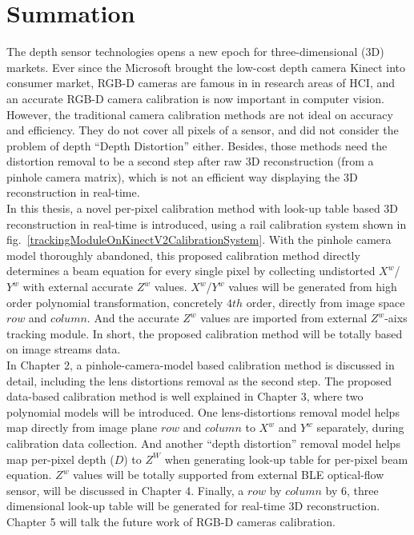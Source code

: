 \section{Summation}
\indent
The depth sensor technologies opens a new epoch for three-dimensional (3D) markets. Ever since the Microsoft brought the low-cost depth camera Kinect into consumer market, RGB-D cameras are famous in in research areas of HCI, and an accurate RGB-D camera calibration is now important in computer vision. However, the traditional camera calibration methods are not ideal on accuracy and efficiency. They do not cover all pixels of a sensor, and did not consider the problem of depth \enquote{Depth Distortion} either. Besides, those methods need the distortion removal to be a second step after raw 3D reconstruction (from a pinhole camera matrix), which is not an efficient way displaying the 3D reconstruction in real-time.
\\\indent
In this thesis, a novel per-pixel calibration method with look-up table based 3D reconstruction in real-time is introduced, using a rail calibration system shown in fig.~\ref{trackingModuleOnKinectV2CalibrationSystem}. With the pinhole camera model thoroughly abandoned, this proposed calibration method directly determines a beam equation for every single pixel by collecting undistorted \(X^{w}\)/\(Y^{w}\) with external accurate \(Z^{w}\) values. \(X^{w}\)/\(Y^{w}\) values will be generated from high order polynomial transformation, concretely \(4th\) order, directly from image space \(row\) and \(column\). And the accurate \(Z^{w}\) values are imported from external \(Z^{w}\)-aixs tracking module. In short, the proposed calibration method will be totally based on image streams data.%
\\\indent
In Chapter 2, a pinhole-camera-model based calibration method is discussed in detail, including the lens distortions removal as the second step. The proposed data-based calibration method is well explained in Chapter 3, where two polynomial models will be introduced. One lens-distortions removal model helps map directly from image plane \(row\) and \(column\) to \(X^{w}\) and \(Y^{w}\) separately, during calibration data collection. And another \enquote{depth distortion} removal model helps map per-pixel depth (\(D\)) to \(Z^W\) when generating look-up table for per-pixel beam equation. \(Z^{w}\) values will be totally supported from external BLE optical-flow sensor, will be discussed in Chapter 4. Finally, a \(row\) by \(column\) by 6, three dimensional look-up table will be generated for real-time 3D reconstruction. Chapter 5 will talk the future work of RGB-D cameras calibration.
%
%
%
%
%
%
%





